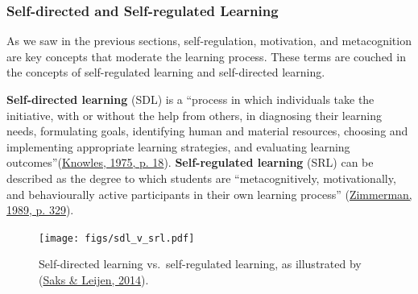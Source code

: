 \documentclass[a4paper, nobind]{templates/ociamthesis}
\begin{document}
\hypertarget{self-directed-and-self-regulated-learning}{%
\subsubsection{Self-directed and Self-regulated Learning}\label{self-directed-and-self-regulated-learning}}

As we saw in the previous sections, self-regulation, motivation, and
metacognition are key concepts that moderate the learning process. These
terms are couched in the concepts of self-regulated learning and
self-directed learning.

\textbf{Self-directed learning} (SDL) is a ``process in which individuals take
the initiative, with or without the help from others, in diagnosing
their learning needs, formulating goals, identifying human and material
resources, choosing and implementing appropriate learning strategies,
and evaluating learning outcomes''(\protect\hyperlink{ref-knowles1975self}{Knowles, 1975, p. 18}).
\textbf{Self-regulated learning} (SRL) can be described as the degree to
which students are ``metacognitively, motivationally, and behaviourally
active participants in their own learning process'' (\protect\hyperlink{ref-zimmerman1989social}{Zimmerman, 1989, p. 329}).

\begin{figure}
\hypertarget{fig_sdl_v_srl}{%
\centering
\texttt{[image: figs/sdl\_v\_srl.pdf]}
\caption{Self-directed learning vs.~self-regulated learning, as illustrated by
(\protect\hyperlink{ref-saks2014distinguishing}{Saks \& Leijen, 2014}).}\label{fig_sdl_v_srl}
}
\end{figure}
\end{document}
